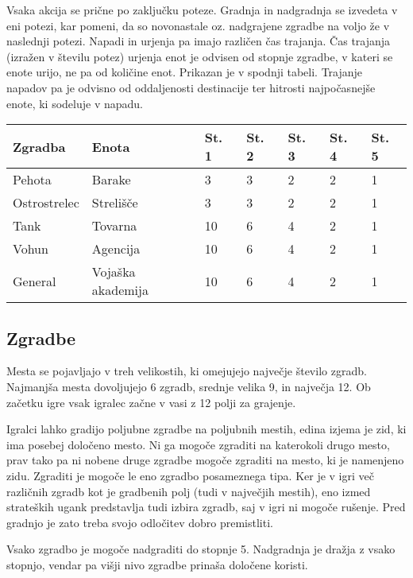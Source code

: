 \documentclass[a4paper, 16pt]{article}
\begin{document}
Vsaka akcija se prične po zaključku poteze. Gradnja in nadgradnja se izvedeta v eni potezi, kar pomeni, da so novonastale oz. nadgrajene zgradbe na voljo že v naslednji potezi.
Napadi in urjenja pa imajo različen čas trajanja. Čas trajanja (izražen v številu potez) urjenja enot je odvisen od stopnje zgradbe, v kateri se enote urijo, ne pa od količine enot. Prikazan je v spodnji tabeli.
Trajanje napadov pa je odvisno od oddaljenosti destinacije ter hitrosti najpočasnejše enote, ki sodeluje v napadu.

\begin{table}[]
    \begin{tabular}{ll|lllll}
    Zgradba      & Enota             & St. 1 & St. 2 & St. 3 & St. 4 & St. 5 \\ \hline
    Pehota       & Barake            & 3     & 3     & 2     & 2     & 1     \\
    Ostrostrelec & Strelišče         & 3     & 3     & 2     & 2     & 1     \\
    Tank         & Tovarna           & 10    & 6     & 4     & 2     & 1     \\
    Vohun        & Agencija          & 10    & 6     & 4     & 2     & 1     \\
    General      & Vojaška akademija & 10    & 6     & 4     & 2     & 1    
    \end{tabular}
\end{table}

\subsection{Zgradbe}

Mesta se pojavljajo v treh velikostih, ki omejujejo največje število zgradb. Najmanjša mesta dovoljujejo 6 zgradb, srednje velika 9, in največja 12.
Ob začetku igre vsak igralec začne v vasi z 12 polji za grajenje. 

Igralci lahko gradijo poljubne zgradbe na poljubnih mestih, edina izjema je zid, ki ima posebej določeno mesto. Ni ga mogoče zgraditi na katerokoli drugo mesto, prav tako pa ni nobene 
druge zgradbe mogoče zgraditi na mesto, ki je namenjeno zidu. Zgraditi je mogoče le eno zgradbo posameznega tipa. Ker je v igri več različnih zgradb kot je gradbenih polj (tudi v največjih mestih), 
eno izmed strateških ugank predstavlja tudi izbira zgradb, saj v igri ni mogoče rušenje. Pred gradnjo je zato treba svojo odločitev dobro premistliti.

Vsako zgradbo je mogoče nadgraditi do stopnje 5. Nadgradnja je dražja z vsako stopnjo, vendar pa višji nivo zgradbe prinaša določene koristi.
\end{document}
